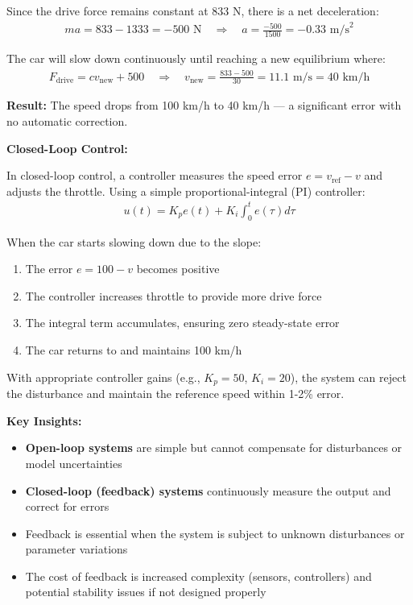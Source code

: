 \documentclass[11pt,a4paper]{article}
\begin{document}
Since the drive force remains constant at 833 N, there is a net deceleration:
\begin{align}
ma = 833 - 1333 = -500 \text{ N} \quad \Rightarrow \quad a = \frac{-500}{1500} = -0.33 \text{ m/s}^2
\end{align}

The car will slow down continuously until reaching a new equilibrium where:
\begin{align}
F_{\text{drive}} = cv_{\text{new}} + 500 \quad \Rightarrow \quad v_{\text{new}} = \frac{833 - 500}{30} = 11.1 \text{ m/s} = 40 \text{ km/h}
\end{align}

\textbf{Result:} The speed drops from 100 km/h to 40 km/h — a significant error with no automatic correction.

\textbf{Closed-Loop Control:}

In closed-loop control, a controller measures the speed error $e = v_{\text{ref}} - v$ and adjusts the throttle. Using a simple proportional-integral (PI) controller:
\begin{align}
u(t) = K_p e(t) + K_i \int_0^t e(\tau) d\tau
\end{align}

When the car starts slowing down due to the slope:
\begin{enumerate}
\item The error $e = 100 - v$ becomes positive
\item The controller increases throttle to provide more drive force
\item The integral term accumulates, ensuring zero steady-state error
\item The car returns to and maintains 100 km/h
\end{enumerate}

With appropriate controller gains (e.g., $K_p = 50$, $K_i = 20$), the system can reject the disturbance and maintain the reference speed within 1-2\% error.

\textbf{Key Insights:}
\begin{itemize}
\item \textbf{Open-loop systems} are simple but cannot compensate for disturbances or model uncertainties
\item \textbf{Closed-loop (feedback) systems} continuously measure the output and correct for errors
\item Feedback is essential when the system is subject to unknown disturbances or parameter variations
\item The cost of feedback is increased complexity (sensors, controllers) and potential stability issues if not designed properly
\end{itemize}
\end{document}
